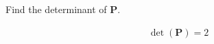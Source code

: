 Find the determinant of $\boldsymbol{P}$.

\begin{solution}
\begin{align*}
    \det \left( \boldsymbol{P} \right) = 2
\end{align*}
\end{solution}
